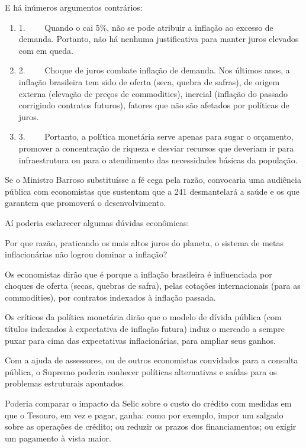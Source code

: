 E há inúmeros argumentos contrários:

\begin{enumerate}
\itemsep1pt\parskip0pt
\item
  1.~~~~ Quando o  cai 5\%, não se pode atribuir a inflação ao
  excesso de demanda. Portanto, não há nenhuma justificativa para manter
  juros elevados com  em queda.
\item
  2.~~~~ Choque de juros combate inflação de demanda. Nos últimos anos,
  a inflação brasileira tem sido de oferta (seca, quebra de safras), de
  origem externa (elevação de preços de commodities), inercial (inflação
  do passado corrigindo contratos futuros), fatores que não são afetados
  por políticas de juros.
\item
  3.~~~~ Portanto, a política monetária serve apenas para sugar o
  orçamento, promover a concentração de riqueza e desviar recursos que
  deveriam ir para infraestrutura ou para o atendimento das necessidades
  básicas da população.
\end{enumerate}

Se o Ministro Barroso substituísse a fé cega pela razão, convocaria uma
audiência pública com economistas que sustentam que a  241
desmantelará a saúde e os que garantem que promoverá o desenvolvimento.

Aí poderia esclarecer algumas dúvidas econômicas:

Por que razão, praticando os mais altos juros do planeta, o sistema de
metas inflacionárias não logrou dominar a inflação?

Os economistas dirão que é porque a inflação brasileira é influenciada
por choques de oferta (secas, quebras de safra), pelas cotações
internacionais (para as commodities), por contratos indexados à inflação
passada.

Os críticos da política monetária dirão que o modelo de dívida pública
(com títulos indexados à expectativa de inflação futura) induz o mercado
a sempre puxar para cima das expectativas inflacionárias, para ampliar
seus ganhos.

Com a ajuda de assessores, ou de outros economistas convidados para a
consulta pública, o Supremo poderia conhecer políticas alternativas e
saídas para os problemas estruturais apontados.

Poderia comparar o impacto da Selic sobre o custo do crédito com medidas
em que o Tesouro, em vez e pagar, ganha: como por exemplo, impor um 
salgado sobre as operações de crédito; ou reduzir os prazos dos
financiamentos; ou exigir um pagamento à vista maior.

